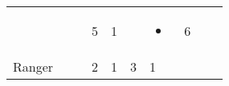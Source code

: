 \documentclass[12pt]{article}
\begin{document}
\begin{longtable}[]{@{}llllllllll@{}}
\begin{minipage}[t]{0.06\columnwidth}\raggedright\strut
\strut\end{minipage} &
\begin{minipage}[t]{0.06\columnwidth}\raggedright\strut
\strut\end{minipage} &
\begin{minipage}[t]{0.06\columnwidth}\raggedright\strut
\strut\end{minipage} &
\begin{minipage}[t]{0.06\columnwidth}\raggedright\strut
5
\strut\end{minipage} &
\begin{minipage}[t]{0.06\columnwidth}\raggedright\strut
1
\strut\end{minipage} &
\begin{minipage}[t]{0.06\columnwidth}\raggedright\strut
\strut\end{minipage} &
\begin{minipage}[t]{0.07\columnwidth}\raggedright\strut
\begin{itemize}
\item
\end{itemize}
\strut\end{minipage} &
\begin{minipage}[t]{0.08\columnwidth}\raggedright\strut
6
\strut\end{minipage}\tabularnewline
\begin{minipage}[t]{0.13\columnwidth}\raggedright\strut
Ranger
\strut\end{minipage} &
\begin{minipage}[t]{0.06\columnwidth}\raggedright\strut
\strut\end{minipage} &
\begin{minipage}[t]{0.06\columnwidth}\raggedright\strut
\strut\end{minipage} &
\begin{minipage}[t]{0.06\columnwidth}\raggedright\strut
2
\strut\end{minipage} &
\begin{minipage}[t]{0.06\columnwidth}\raggedright\strut
1
\strut\end{minipage} &
\begin{minipage}[t]{0.06\columnwidth}\raggedright\strut
3
\strut\end{minipage} &
\begin{minipage}[t]{0.06\columnwidth}\raggedright\strut
1
\strut\end{minipage} &
\begin{minipage}[t]{0.06\columnwidth}\raggedright\strut

\end{minipage}
\end{longtable}
\end{document}
